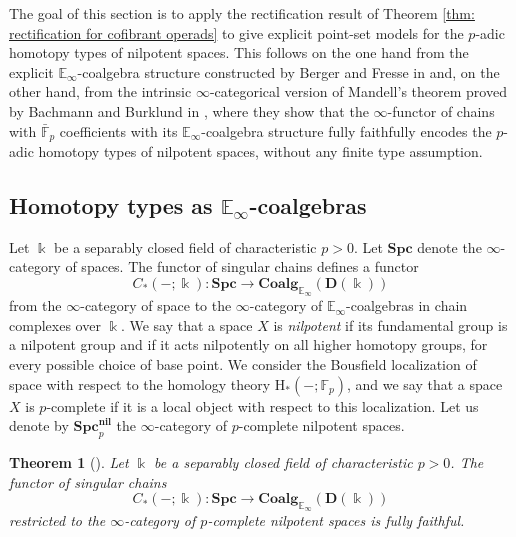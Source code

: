 \documentclass{proc-l}
\theoremstyle{plain}
\newtheorem{theorem}{Theorem}[section]
\theoremstyle{definition}
\theoremstyle{remark}
\newcommand{\kk}{\Bbbk}
\begin{document}
\vspace{2.5pc}

The goal of this section is to apply the rectification result of Theorem \ref{thm: rectification for cofibrant operads} to give explicit point-set models for the $p$-adic homotopy types of nilpotent spaces. This follows on the one hand from the explicit $\mathbb{E}_\infty$-coalgebra structure constructed by Berger and Fresse in \cite{BergerFresse} and, on the other hand, from the intrinsic $\infty$-categorical version of Mandell's theorem proved by Bachmann and Burklund in \cite{bachmann2024}, where they show that the $\infty$-functor of chains with $\bar{\mathbb{F}}_p$ coefficients with its $\mathbb{E}_\infty$-coalgebra structure fully faithfully encodes the $p$-adic homotopy types of nilpotent spaces, without any finite type assumption.

\subsection{Homotopy types as $\mathbb{E}_\infty$-coalgebras}%
\label{Section:5.1}
Let $\kk$ be a separably closed field of characteristic $p >0$. Let $\mathbf{Spc}$ denote the $\infty$-category of spaces. The functor of singular chains defines a functor
\[
C_*(-;\kk): \mathbf{Spc} \longrightarrow \mathbf{Coalg}_{\mathbb{E}_\infty}(\mathbf{D}(\kk))
\]
from the $\infty$-category of space to the $\infty$-category of $\mathbb{E}_\infty$-coalgebras in chain complexes over $\kk$. We say that a space $X$ is \textit{nilpotent} if its fundamental group is a nilpotent group and if it acts nilpotently on all higher homotopy groups, for every possible choice of base point. We consider the Bousfield localization of space with respect to the homology theory $\mathrm{H}_*(-; \mathbb{F}_p)$, and we say that a space $X$ is $p$-complete if it is a local object with respect to this localization. Let us denote by $\mathbf{Spc}_p^{\mathbf{nil}}$ the $\infty$-category of $p$-complete nilpotent spaces.

\begin{theorem}[{\cite[Theorem 1.2]{bachmann2024}}]%
\label{Theorem:5.1}\label{thm: bachmann-burklund}
Let $\kk$ be a separably closed field of characteristic $p >0$. The functor of singular chains
\[
C_*(-;\kk): \mathbf{Spc} \longrightarrow \mathbf{Coalg}_{\mathbb{E}_\infty}(\mathbf{D}(\kk))
\]
restricted to the $\infty$-category of $p$-complete nilpotent spaces is fully faithful.
\end{theorem}
\end{document}
